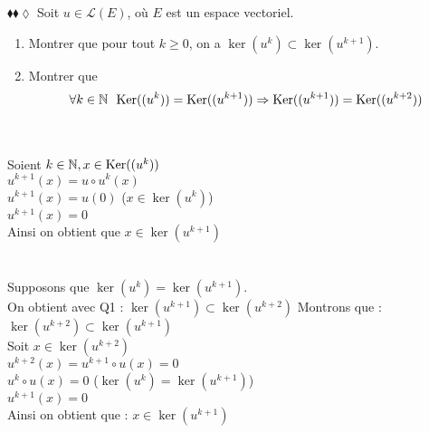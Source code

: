 \documentclass[11pt]{article}
\begin{document}
\begin{exercise}{$\blacklozenge\blacklozenge\lozenge$}{}
    Soit $u \in \mathcal{L}(E)$, où $E$ est un espace vectoriel.
     \begin{enumerate}[topsep=0pt,itemsep=-0.9 ex]
        \item Montrer que pour tout $k \geq 0$, on a $\ker{(u^{k})} \subset \ker{(u^{k+1})}$.
        \item Montrer que
        \begin{equation*}
            \forall k \in \mathbb{N} ~~ \textrm{Ker}((u^{k})) = \textrm{Ker}((u^{k+1})) \Rightarrow \textrm{Ker}((u^{k+1})) = \textrm{Ker}((u^{k+2}))
        \end{equation*}
    \end{enumerate}
    \tcblower\\[0.2cm]
    \\
    Soient $k \in \mathbb{N}, x \in \textrm{Ker}((u^{k}))$\\
    $u^{k+1}{(x)} = u \circ u^{k}{(x)}$\\
    $u^{k+1}{(x)} = u{(0)}$ ($x \in \ker{(u^{k})}$)\\
    $u^{k+1}{(x)} = 0$\\
    Ainsi on obtient que $x \in \ker{(u^{k+1})}$\\\\
    \\
    \fbox{$\Rightarrow$} Supposons que $\ker{(u^{k})} = \ker{(u^{k+1})}$.\\
    On obtient avec Q1 : $\ker{(u^{k+1})} \subset \ker{(u^{k+2})}$
    Montrons que : $\ker{(u^{k+2})} \subset \ker{(u^{k+1})}$\\
    Soit $x \in \ker{(u^{k+2})}$\\
    $u^{k+2}{(x)} = u^{k+1} \circ u{(x)} = 0$\\
    $u^{k} \circ u{(x)} = 0$ ($\ker{(u^{k})} = \ker{(u^{k+1})}$)\\
    $u^{k+1}{(x)} = 0$\\
    Ainsi on obtient que : $x \in \ker{(u^{k+1})}$
\end{exercise}
\end{document}

